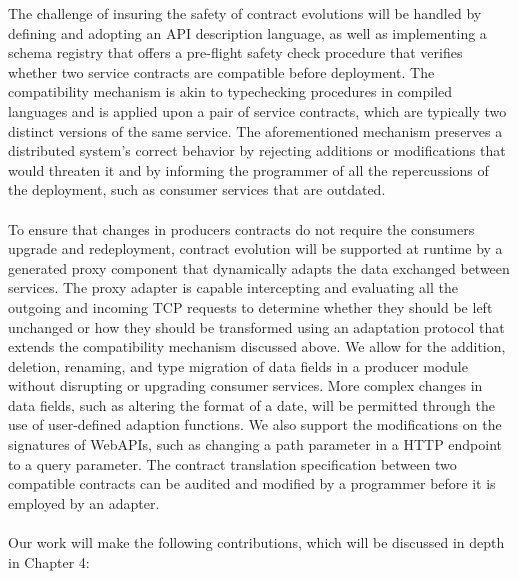 The challenge of insuring the safety of contract evolutions will be handled by defining and adopting an API description language, as well as implementing a schema
registry that offers a pre-flight safety check procedure that verifies whether two service contracts are compatible before
deployment.
The compatibility mechanism is akin to typechecking procedures in compiled languages and is applied upon a
pair of service contracts, which are typically two distinct versions of the same service. The aforementioned mechanism preserves
a distributed system's correct behavior by rejecting additions or modifications that would threaten it and by informing the programmer
of all the repercussions of the deployment, such as consumer services that are outdated.

\paragraph{}

To ensure that changes in producers contracts do not require the consumers upgrade and redeployment, contract evolution
will be supported at runtime by a generated proxy component that dynamically adapts the data exchanged between services.
The proxy adapter is capable intercepting and evaluating all the outgoing and incoming TCP requests to determine whether
they should be left unchanged or how they should be transformed using an adaptation protocol that extends the compatibility mechanism discussed above.
We allow for the addition, deletion, renaming, and type migration of data fields in a producer module without disrupting or upgrading consumer services.
More complex changes in data fields, such as altering the format of a date, will be permitted through the use of user-defined adaption functions.
We also support the modifications on the signatures of WebAPIs, such as changing a path parameter in a HTTP endpoint to a query parameter.
The contract translation specification between two compatible contracts can be audited and modified by a programmer before it is employed by an adapter.

\paragraph{}

Our work will make the following contributions, which will be discussed in depth in Chapter 4:

